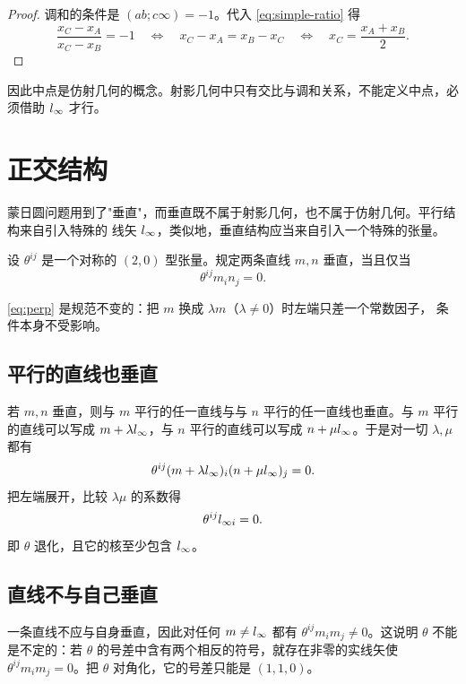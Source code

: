 \begin{proof}
调和的条件是 $(ab;c\infty)=-1$。代入 \eqref{eq:simple-ratio} 得
\[
\frac{x_C-x_A}{x_C-x_B}=-1
\quad\Longleftrightarrow\quad
x_C-x_A=x_B-x_C
\quad\Longleftrightarrow\quad
x_C=\frac{x_A+x_B}{2}.
\]
\end{proof}

因此中点是仿射几何的概念。射影几何中只有交比与调和关系，不能定义中点，必须借助 $l_{\infty}$ 才行。

\section{正交结构}

蒙日圆问题用到了"垂直"，而垂直既不属于射影几何，也不属于仿射几何。平行结构来自引入特殊的
线矢 $l_{\infty}$，类似地，垂直结构应当来自引入一个特殊的张量。

\begin{definition}[垂直]
设 $\theta^{ij}$ 是一个对称的 $(2,0)$ 型张量。规定两条直线 $m,n$ 垂直，当且仅当
\begin{equation}
\theta^{ij}m_in_j=0 .
\label{eq:perp}
\end{equation}
\end{definition}

\eqref{eq:perp} 是规范不变的：把 $m$ 换成 $\lambda m$（$\lambda\ne0$）时左端只差一个常数因子，
条件本身不受影响。

\subsection{平行的直线也垂直}

若 $m,n$ 垂直，则与 $m$ 平行的任一直线与与 $n$ 平行的任一直线也垂直。与 $m$ 平行的直线可以写成
$m+\lambda l_{\infty}$，与 $n$ 平行的直线可以写成 $n+\mu l_{\infty}$。于是对一切 $\lambda,\mu$ 都有
\[
\theta^{ij}(m+\lambda l_{\infty})_i(n+\mu l_{\infty})_j=0 .
\]
把左端展开，比较 $\lambda\mu$ 的系数得
\begin{equation}
\theta^{ij}l_{\infty i}=0 .
\label{eq:theta-degenerate}
\end{equation}
即 $\theta$ 退化，且它的核至少包含 $l_{\infty}$。

\subsection{直线不与自己垂直}

一条直线不应与自身垂直，因此对任何 $m\ne l_{\infty}$ 都有 $\theta^{ij}m_im_j\ne0$。这说明 $\theta$
不能是不定的：若 $\theta$ 的号差中含有两个相反的符号，就存在非零的实线矢使
$\theta^{ij}m_im_j=0$。把 $\theta$ 对角化，它的号差只能是 $(1,1,0)$。

